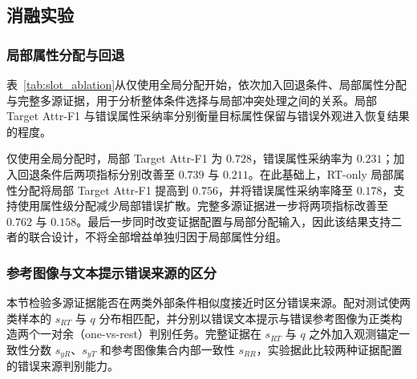 \documentclass[journal]{IEEEtran}
\begin{document}
\subsection{消融实验}
\subsubsection{局部属性分配与回退}
表~\ref{tab:slot_ablation}从仅使用全局分配开始，依次加入回退条件、局部属性分配与完整多源证据，用于分析整体条件选择与局部冲突处理之间的关系。局部 Target Attr-F1 与错误属性采纳率分别衡量目标属性保留与错误外观进入恢复结果的程度。

\begin{table}[!t]
\centering
\caption{局部属性分配与回退条件消融。}
\label{tab:slot_ablation}
{\scriptsize
\renewcommand{\arraystretch}{0.92}
\setlength{\tabcolsep}{1mm}
}
\end{table}

仅使用全局分配时，局部 Target Attr-F1 为 $0.728$，错误属性采纳率为 $0.231$；加入回退条件后两项指标分别改善至 $0.739$ 与 $0.211$。在此基础上，RT-only 局部属性分配将局部 Target Attr-F1 提高到 $0.756$，并将错误属性采纳率降至 $0.178$，支持使用属性级分配减少局部错误扩散。完整多源证据进一步将两项指标改善至 $0.762$ 与 $0.158$。最后一步同时改变证据配置与局部分配输入，因此该结果支持二者的联合设计，不将全部增益单独归因于局部属性分组。

\subsubsection{参考图像与文本提示错误来源的区分}
本节检验多源证据能否在两类外部条件相似度接近时区分错误来源。配对测试使两类样本的 $s_{RT}$ 与 $q$ 分布相匹配，并分别以错误文本提示与错误参考图像为正类构造两个一对余（one-vs-rest）判别任务。完整证据在 $s_{RT}$ 与 $q$ 之外加入观测锚定一致性分数 $s_{yR}$、$s_{yT}$ 和参考图像集合内部一致性 $s_{RR}$，实验据此比较两种证据配置的错误来源判别能力。
\end{document}
